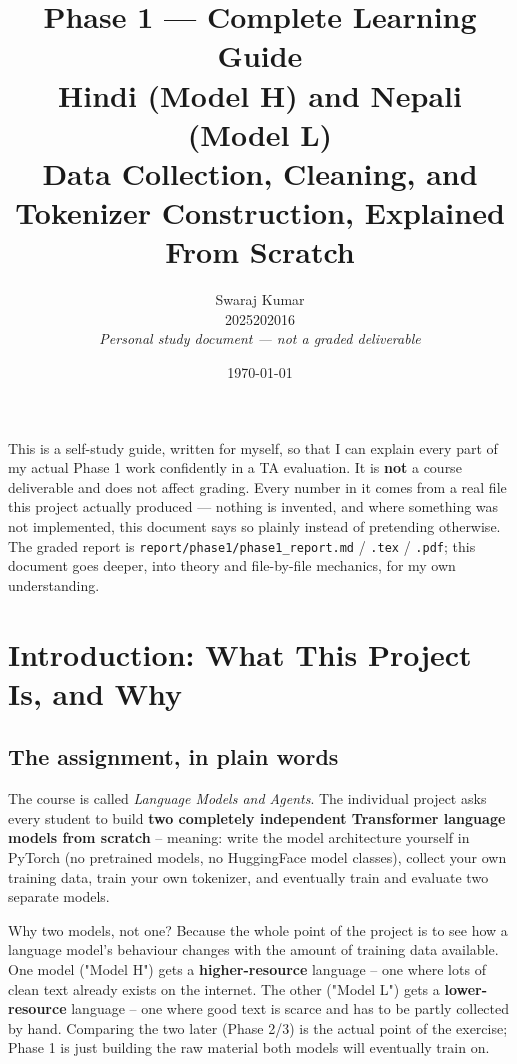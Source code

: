 \documentclass[11pt]{report}
\title{\Huge\textbf{Phase 1 — Complete Learning Guide}\\[0.3cm]
\Large Hindi (Model H) and Nepali (Model L)\\[0.2cm]
\large Data Collection, Cleaning, and Tokenizer Construction, Explained From Scratch}
\author{Swaraj Kumar \\ \small 2025202016 \\[0.2cm]
\small \textit{Personal study document --- not a graded deliverable}}
\date{\today}
\begin{document}
\maketitle

\begin{tcolorbox}[colback=gray!8,colframe=gray!50!black,title={\textbf{What this document is}}]
This is a self-study guide, written for myself, so that I can explain
every part of my actual Phase 1 work confidently in a TA evaluation. It is
\textbf{not} a course deliverable and does not affect grading. Every
number in it comes from a real file this project actually produced ---
nothing is invented, and where something was not implemented, this
document says so plainly instead of pretending otherwise. The graded
report is \texttt{report/phase1/phase1\_report.md} / \texttt{.tex} /
\texttt{.pdf}; this document goes deeper, into theory and file-by-file
mechanics, for my own understanding.
\end{tcolorbox}

\tableofcontents

\chapter{Introduction: What This Project Is, and Why}

\section{The assignment, in plain words}

The course is called \textit{Language Models and Agents}. The individual
project asks every student to build \textbf{two completely independent
Transformer language models from scratch} -- meaning: write the model
architecture yourself in PyTorch (no pretrained models, no HuggingFace
model classes), collect your own training data, train your own tokenizer,
and eventually train and evaluate two separate models.

\begin{concept}{Why two models, not one?}
Because the whole point of the project is to see how a language model's
behaviour changes with the amount of training data available. One model
("Model H") gets a \textbf{higher-resource} language -- one where lots of
clean text already exists on the internet. The other ("Model L") gets a
\textbf{lower-resource} language -- one where good text is scarce and has
to be partly collected by hand. Comparing the two later (Phase 2/3) is
the actual point of the exercise; Phase 1 is just building the raw
material both models will eventually train on.
\end{concept}
\end{document}
